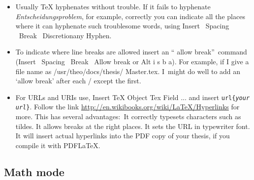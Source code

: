 \begin{itemize}
\item Usually TeX hyphenates without trouble. If it fails to hyphenate \emph{%
Entscheidungsproblem}, for example, correctly you can indicate all the
places where it can hyphenate such troublesome words, using Insert 
\TEXTsymbol{>}\TEXTsymbol{>}\ Spacing \TEXTsymbol{>}\TEXTsymbol{>}\ Break 
\TEXTsymbol{>}\TEXTsymbol{>}\ Discretionany Hyphen.

\item To indicate where line breaks are allowed insert an \textquotedblleft
allow break\textquotedblright\ command (Insert \TEXTsymbol{>}\TEXTsymbol{>}\
Spacing \TEXTsymbol{>}\TEXTsymbol{>}\ Break \TEXTsymbol{>}\TEXTsymbol{>}\
Allow break or Alt i s b a). For example, if I give a file name as
/usr/\allowbreak theo/\allowbreak docs/\allowbreak thesis/\allowbreak
Master.tex. I\ might do well to add an `allow break' after each / except the
first.

\item For URLs and URIs use, Insert \TEXTsymbol{>}\TEXTsymbol{>} TeX Object 
\TEXTsymbol{>}\TEXTsymbol{>} Tex Field ... and insert \texttt{\TEXTsymbol{%
\backslash}url\{\emph{your url}\}}. Follow the link %
\url{http://en.wikibooks.org/wiki/LaTeX/Hyperlinks} for more. This has
several advantages:\ It correctly typesets characters such as tildes. It
allows breaks at the right places. It sets the URL in typewriter font. It
will insert actual hyperlinks into the PDF copy of your thesis, if you
compile it with PDFLaTeX.
\end{itemize}

\subsection{Math mode}

